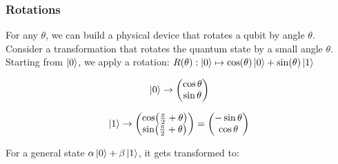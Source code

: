 \subsubsection{Rotations}
\begin{definition}
For any $\theta$, we can build a physical device that rotates a qubit by angle $\theta$. Consider a transformation that rotates the quantum state by a small angle $\theta$. Starting from $\ket{0}$, we apply a rotation:
$R(\theta): \ket{0} \mapsto \cos(\theta)\ket{0} + \sin(\theta)\ket{1}$

$$\ket{0} \to \begin{pmatrix} \cos\theta \\ \sin\theta \end{pmatrix}$$

$$\ket{1} \to \begin{pmatrix} \cos(\frac{\pi}{2} + \theta) \\ \sin(\frac{\pi}{2} + \theta) \end{pmatrix} = \begin{pmatrix} -\sin\theta \\ \cos\theta \end{pmatrix}$$

\begin{center}
\end{center}

For a general state $\alpha\ket{0} + \beta\ket{1}$, it gets transformed to:


\end{definition}
